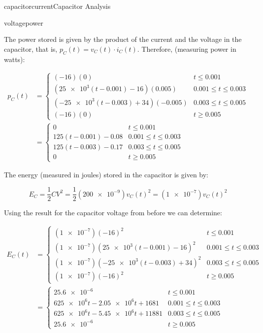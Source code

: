 \begin{mainquestion}{capacitorcurrent}{Capacitor Analysis}
\begin{partquestion}{voltagepower}
\begin{answer}
The power stored is given by the product of the current and the voltage in the capacitor, that is, $p_C(t) = v_C(t) \cdot i_C(t)$. Therefore, (measuring power in watts):

\begin{align*}
p_C(t) &= \begin{cases}
(- 16)(0) & t \leq 0.001 \\
(\num{25e3} (t - 0.001) - 16)(0.005) & 0.001 \leq t \leq 0.003 \\
(\num{-25e3} (t - 0.003) + 34)(-0.005) & 0.003 \leq t \leq 0.005 \\
(- 16)(0) & t \geq 0.005
\end{cases} \\
&= \begin{cases}
0 & t \leq 0.001 \\
125(t - 0.001) -0.08 & 0.001 \leq t \leq 0.003 \\
125(t - 0.003) -0.17 & 0.003 \leq t \leq 0.005 \\
0 & t \geq 0.005
\end{cases}
\end{align*}

The energy (measured in joules) stored in the capacitor is given by:

\[
E_C = \frac{1}{2} C V^2 = \frac{1}{2}(\num{200e-9}) v_C(t)^2 = (\num{1e-7}) v_C(t)^2
\]

Using the result for the capacitor voltage from before we can determine:

\begin{align*}
E_C(t) &= \begin{cases}
(\num{1e-7})(-16)^2 & t \leq 0.001 \\
(\num{1e-7})(\num{25e3} (t - 0.001) - 16)^2 & 0.001 \leq t \leq 0.003 \\
(\num{1e-7})(\num{-25e3} (t - 0.003) + 34)^2 & 0.003 \leq t \leq 0.005 \\
(\num{1e-7})(-16)^2 & t \geq 0.005
\end{cases} \\
&= \begin{cases}
\num{25.6e-6} & t \leq 0.001 \\
\num{625e6}t - \num{2.05e6}t + 1681 & 0.001 \leq t \leq 0.003 \\
\num{625e6}t - \num{5.45e6}t + 11881 & 0.003 \leq t \leq 0.005 \\
\num{25.6e-6} & t \geq 0.005
\end{cases}
\end{align*}


\end{answer}
\end{partquestion}
\end{mainquestion}
